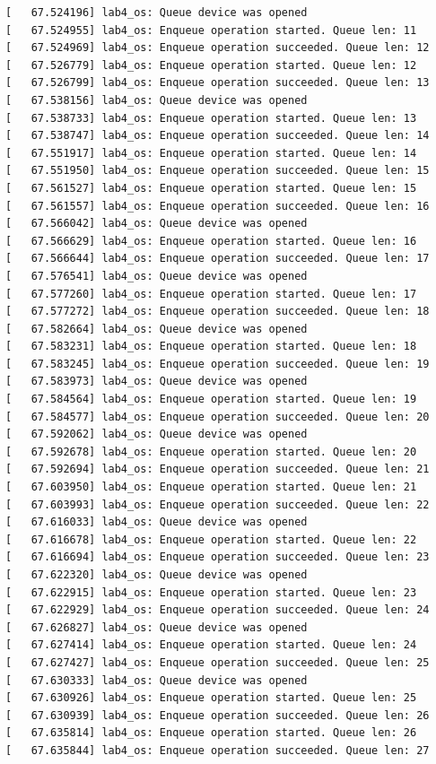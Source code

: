 \documentclass[a4paper,14pt]{extarticle}
\begin{document}
\begin{verbatim}
[   67.524196] lab4_os: Queue device was opened
[   67.524955] lab4_os: Enqueue operation started. Queue len: 11
[   67.524969] lab4_os: Enqueue operation succeeded. Queue len: 12
[   67.526779] lab4_os: Enqueue operation started. Queue len: 12
[   67.526799] lab4_os: Enqueue operation succeeded. Queue len: 13
[   67.538156] lab4_os: Queue device was opened
[   67.538733] lab4_os: Enqueue operation started. Queue len: 13
[   67.538747] lab4_os: Enqueue operation succeeded. Queue len: 14
[   67.551917] lab4_os: Enqueue operation started. Queue len: 14
[   67.551950] lab4_os: Enqueue operation succeeded. Queue len: 15
[   67.561527] lab4_os: Enqueue operation started. Queue len: 15
[   67.561557] lab4_os: Enqueue operation succeeded. Queue len: 16
[   67.566042] lab4_os: Queue device was opened
[   67.566629] lab4_os: Enqueue operation started. Queue len: 16
[   67.566644] lab4_os: Enqueue operation succeeded. Queue len: 17
[   67.576541] lab4_os: Queue device was opened
[   67.577260] lab4_os: Enqueue operation started. Queue len: 17
[   67.577272] lab4_os: Enqueue operation succeeded. Queue len: 18
[   67.582664] lab4_os: Queue device was opened
[   67.583231] lab4_os: Enqueue operation started. Queue len: 18
[   67.583245] lab4_os: Enqueue operation succeeded. Queue len: 19
[   67.583973] lab4_os: Queue device was opened
[   67.584564] lab4_os: Enqueue operation started. Queue len: 19
[   67.584577] lab4_os: Enqueue operation succeeded. Queue len: 20
[   67.592062] lab4_os: Queue device was opened
[   67.592678] lab4_os: Enqueue operation started. Queue len: 20
[   67.592694] lab4_os: Enqueue operation succeeded. Queue len: 21
[   67.603950] lab4_os: Enqueue operation started. Queue len: 21
[   67.603993] lab4_os: Enqueue operation succeeded. Queue len: 22
[   67.616033] lab4_os: Queue device was opened
[   67.616678] lab4_os: Enqueue operation started. Queue len: 22
[   67.616694] lab4_os: Enqueue operation succeeded. Queue len: 23
[   67.622320] lab4_os: Queue device was opened
[   67.622915] lab4_os: Enqueue operation started. Queue len: 23
[   67.622929] lab4_os: Enqueue operation succeeded. Queue len: 24
[   67.626827] lab4_os: Queue device was opened
[   67.627414] lab4_os: Enqueue operation started. Queue len: 24
[   67.627427] lab4_os: Enqueue operation succeeded. Queue len: 25
[   67.630333] lab4_os: Queue device was opened
[   67.630926] lab4_os: Enqueue operation started. Queue len: 25
[   67.630939] lab4_os: Enqueue operation succeeded. Queue len: 26
[   67.635814] lab4_os: Enqueue operation started. Queue len: 26
[   67.635844] lab4_os: Enqueue operation succeeded. Queue len: 27

\end{verbatim}
\end{document}
